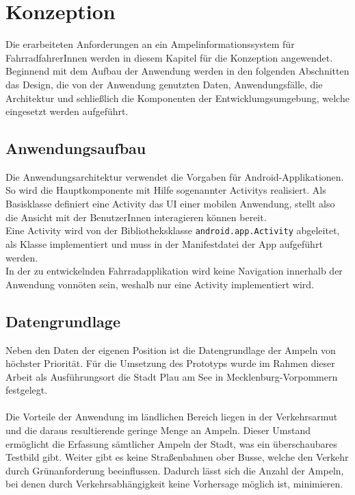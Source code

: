 \chapter{\label{chap:entwurf}Konzeption}
Die erarbeiteten Anforderungen an ein Ampelinformationssystem für FahrradfahrerInnen werden in diesem Kapitel für die Konzeption angewendet. Beginnend mit dem Aufbau der Anwendung werden in den folgenden Abschnitten das Design, die von der Anwendung genutzten Daten, Anwendungsfälle, die Architektur und schließlich die Komponenten der Entwicklumgsumgebung, welche eingesetzt werden aufgeführt. 
\section{Anwendungsaufbau}
Die Anwendungsarchitektur verwendet die Vorgaben für Android-Applikationen. So wird die Hauptkomponente mit Hilfe sogenannter \glspl{Activity} realisiert. Als Basisklasse definiert eine \gls{Activity} das \gls{UI} einer mobilen Anwendung, stellt also die Ansicht mit der BenutzerInnen interagieren können bereit.\\
Eine \gls{Activity} wird von der Bibliotheksklasse \texttt{android.app.Activity} abgeleitet, als Klasse implementiert und muss in der Manifestdatei der \gls{App} aufgeführt werden. \cite{android_activity} \\
In der zu entwickelnden Fahrradapplikation wird keine Navigation innerhalb der Anwendung vonnöten sein, weshalb nur eine \gls{Activity} implementiert wird.
%
%
\section{Datengrundlage}
Neben den Daten der eigenen Position ist die Datengrundlage der Ampeln von höchster Priorität. Für die Umsetzung des Prototyps wurde im Rahmen dieser Arbeit als Ausführungsort die Stadt Plau am See in Mecklenburg-Vorpommern festgelegt.\\\\ 
Die Vorteile der Anwendung im ländlichen Bereich liegen in der Verkehrsarmut und die daraus resultierende geringe Menge an Ampeln. Dieser Umstand ermöglicht die Erfassung sämtlicher Ampeln der Stadt, was ein überschaubares Testbild gibt. 
Weiter gibt es keine Straßenbahnen ober Busse, welche den Verkehr durch Grünanforderung beeinflussen. Dadurch lässt sich die Anzahl der Ampeln, bei denen durch Verkehrsabhängigkeit keine Vorhersage möglich ist, minimieren. 

%
%
\clearpage
